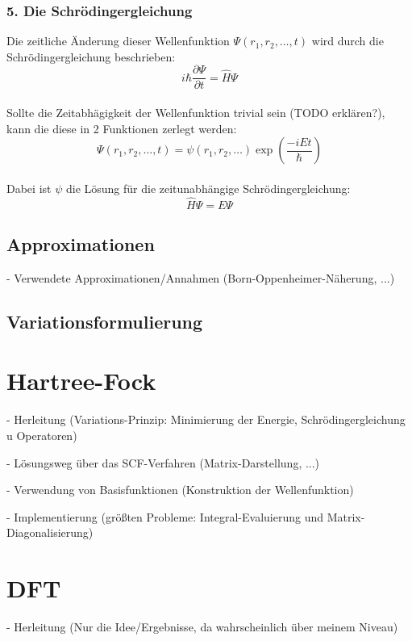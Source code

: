 \documentclass[a4paper, 12pt]{report}
\begin{document}
\subsubsection{5. Die Schrödingergleichung}
Die zeitliche Änderung dieser Wellenfunktion $\Psi(r_1, r_2, \dots, t)$ 
wird durch die Schrödingergleichung beschrieben:
\begin{equation}
  i\hbar\frac{\partial\Psi}{\partial t} = \hat{H}\Psi
\end{equation}\\
Sollte die Zeitabhägigkeit der Wellenfunktion trivial sein (TODO erklären?),
kann die diese in 2 Funktionen zerlegt werden:
\begin{equation*}
  \Psi(r_1, r_2, \dots, t) = \psi(r_1, r_2, \dots) \exp(\frac{-iEt}{\hbar})
\end{equation*}\\
Dabei ist $\psi$ die Lösung für die zeitunabhängige Schrödingergleichung:
\begin{equation}
  \hat{H}\Psi = E\Psi
\end{equation}

\subsection{Approximationen}
- Verwendete Approximationen/Annahmen (Born-Oppenheimer-Näherung, ...)

\subsection{Variationsformulierung}

\section{Hartree-Fock}
- Herleitung (Variations-Prinzip: Minimierung der Energie,
Schrödingergleichung u Operatoren)

- Lösungsweg über das SCF-Verfahren (Matrix-Darstellung, ...)

- Verwendung von Basisfunktionen (Konstruktion der Wellenfunktion)

- Implementierung (größten Probleme: Integral-Evaluierung und
Matrix-Diagonalisierung)

\section{DFT}
- Herleitung (Nur die Idee/Ergebnisse, da wahrscheinlich über
meinem Niveau)
\end{document}
